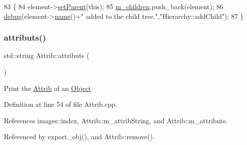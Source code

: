 \begin{DoxyCode}
83                                           \{
84   element->\hyperlink{classHierarchy_a585ad1aeec16077a0e532ab8b4fc557b}{setParent}(\textcolor{keyword}{this});
85   \hyperlink{classHierarchy_a038816763941fd4a930504917f60483b}{m\_children}.push\_back(element);
86   \hyperlink{classObject_aac010553f022165573714b7014a15f0d}{debug}(element->\hyperlink{classObject_a300f4c05dd468c7bb8b3c968868443c1}{name}()+\textcolor{stringliteral}{" added to the child tree."},\textcolor{stringliteral}{"Hierarchy::addChild"});
87 \}
\end{DoxyCode}
\mbox{\label{classAttrib_aee7bbf16b144887f196e1341b24f8a26}} 
\subsubsection{\texorpdfstring{attributs()}{attributs()}}
{\footnotesize\ttfamily std\+::string Attrib\+::attributs (\begin{DoxyParamCaption}{ }\end{DoxyParamCaption})\hspace{0.3cm}{\ttfamily [inherited]}}

Print the \hyperlink{classAttrib}{Attrib} of an \hyperlink{classObject}{Object} 

Definition at line 54 of file Attrib.\+cpp.



References images\+::index, Attrib\+::m\+\_\+attrib\+String, and Attrib\+::m\+\_\+attributs.



Referenced by export\+\_\+obj(), and Attrib\+::remove().


